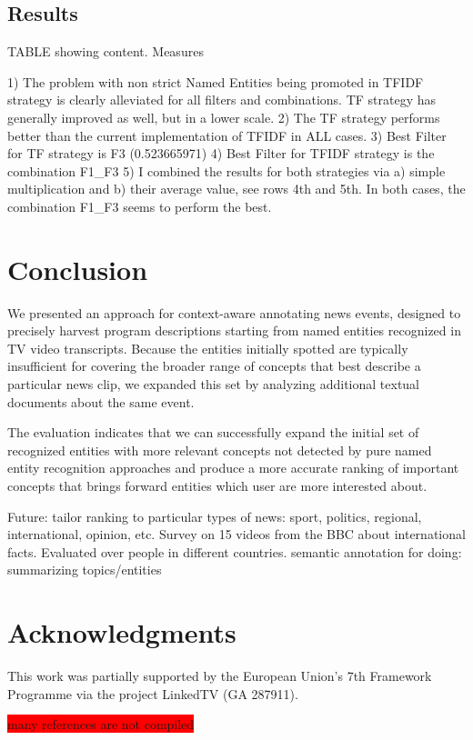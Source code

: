 \documentclass{llncs}
\newcommand{\todo}[1]{\colorbox{red}{#1}}
\begin{document}
\subsection{Results}


TABLE showing content. Measures

1) The problem with non strict Named Entities being promoted in TFIDF strategy is clearly alleviated for all filters and combinations. TF strategy has generally improved as well, but in a lower scale.
2) The TF strategy performs better than the current implementation of TFIDF in ALL cases.
3) Best Filter for TF strategy is F3 (0.523665971)
4) Best Filter for TFIDF strategy is the combination F1\_F3
5) I combined the results for both strategies via a) simple multiplication and b) their average value, see rows 4th and 5th. In both cases, the combination F1\_F3 seems to perform the best.



\section{Conclusion}
\label{sec:Conclusion}
We presented an approach for context-aware annotating news events, designed to precisely harvest program descriptions starting from named entities recognized in TV video transcripts. Because the entities initially spotted are typically insufficient for covering the broader range of concepts that best describe a particular news clip, we expanded this set by analyzing additional textual documents about the same event.

The evaluation indicates that we can successfully expand the initial set of recognized entities with more relevant concepts not detected by pure named entity recognition approaches and produce a more accurate ranking of important concepts that brings forward entities which user are more interested about.

Future: tailor ranking to particular types of news: sport, politics, regional, international, opinion, etc. Survey on 15 videos from the BBC about international facts. Evaluated over people in different countries.
semantic annotation for doing: summarizing topics/entities



\section*{Acknowledgments}
This work was partially supported by the European Union's 7th Framework Programme via the project LinkedTV (GA 287911).

\todo{many references are not compiled}


\end{document}

